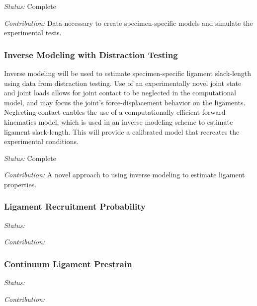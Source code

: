 \emph{Status:} Complete

\emph{Contribution:} Data necessary to create specimen-specific models and simulate the experimental tests.
\subsubsection{Inverse Modeling with Distraction Testing}
Inverse modeling will be used to estimate specimen-specific ligament slack-length using data from distraction testing. Use of an experimentally novel joint state and joint loads allows for joint contact to be neglected in the computational model, and may focus the joint's force-displacement behavior on the ligaments. Neglecting contact enables the use of a computationally efficient forward kinematics model, which is used in an inverse modeling scheme to estimate ligament slack-length. This will provide a calibrated model that recreates the experimental conditions. 

\emph{Status:} Complete

\emph{Contribution:} A novel approach to using inverse modeling to estimate ligament properties.
\subsubsection{Ligament Recruitment Probability}

\emph{Status:}

\emph{Contribution:}
\subsubsection{Continuum Ligament Prestrain}

\emph{Status:}

\emph{Contribution:}